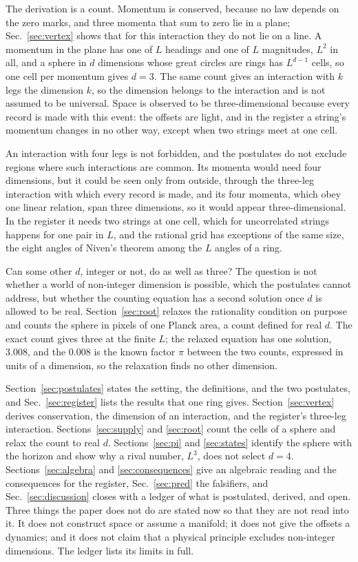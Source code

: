 \documentclass[aps,prd,twocolumn,superscriptaddress,nofootinbib]{revtex4-2}
\begin{document}
The derivation is a count. Momentum is conserved, because no law depends on the zero marks, and three momenta that sum to zero lie in a plane; Sec.~\ref{sec:vertex} shows that for this interaction they do not lie on a line. A momentum in the plane has one of $L$ headings and one of $L$ magnitudes, $L^2$ in all, and a sphere in $d$ dimensions whose great circles are rings has $L^{d-1}$ cells, so one cell per momentum gives $d = 3$. The same count gives an interaction with $k$ legs the dimension $k$, so the dimension belongs to the interaction and is not assumed to be universal. Space is observed to be three-dimensional because every record is made with this event: the offsets are light, and in the register a string's momentum changes in no other way, except when two strings meet at one cell.

An interaction with four legs is not forbidden, and the postulates do not exclude regions where such interactions are common. Its momenta would need four dimensions, but it could be seen only from outside, through the three-leg interaction with which every record is made, and its four momenta, which obey one linear relation, span three dimensions, so it would appear three-dimensional. In the register it needs two strings at one cell, which for uncorrelated strings happens for one pair in $L$, and the rational grid has exceptions of the same size, the eight angles of Niven's theorem among the $L$ angles of a ring.

Can some other $d$, integer or not, do as well as three? The question is not whether a world of non-integer dimension is possible, which the postulates cannot address, but whether the counting equation has a second solution once $d$ is allowed to be real. Section~\ref{sec:root} relaxes the rationality condition on purpose and counts the sphere in pixels of one Planck area, a count defined for real $d$. The exact count gives three at the finite $L$; the relaxed equation has one solution, $3.008$, and the $0.008$ is the known factor $\pi$ between the two counts, expressed in units of a dimension, so the relaxation finds no other dimension.

Section~\ref{sec:postulates} states the setting, the definitions, and the two postulates, and Sec.~\ref{sec:register} lists the results that one ring gives. Section~\ref{sec:vertex} derives conservation, the dimension of an interaction, and the register's three-leg interaction. Sections~\ref{sec:supply} and \ref{sec:root} count the cells of a sphere and relax the count to real $d$. Sections~\ref{sec:pi} and \ref{sec:states} identify the sphere with the horizon and show why a rival number, $L^3$, does not select $d = 4$. Sections~\ref{sec:algebra} and \ref{sec:consequences} give an algebraic reading and the consequences for the register, Sec.~\ref{sec:pred} the falsifiers, and Sec.~\ref{sec:discussion} closes with a ledger of what is postulated, derived, and open. Three things the paper does not do are stated now so that they are not read into it. It does not construct space or assume a manifold; it does not give the offsets a dynamics; and it does not claim that a physical principle excludes non-integer dimensions. The ledger lists its limits in full.
\end{document}
